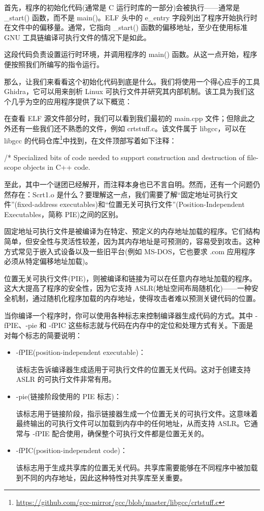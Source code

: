 首先，程序的初始化代码(通常是 C 运行时库的一部分)会被执行——通常是 \_start() 函数，而不是 main()。ELF 头中的 e\_entry 字段列出了程序开始执行时在文件中的偏移量。通常，它指向 \_start() 函数的偏移地址，至少在使用标准 GNU 工具链编译可执行文件的情况下是如此。

这段代码负责设置运行时环境，并调用程序的 main() 函数。从这一点开始，程序便按照我们所编写的指令运行。

那么，让我们来看看这个初始化代码到底是什么。我们将使用一个得心应手的工具 Ghidra，它可以用来剖析 Linux 可执行文件并研究其内部机制。该工具为我们这个几乎为空的应用程序提供了以下概览：


在查看 ELF 源文件部分时，我们可以看到我们最初的 main.cpp 文件；但除此之外还有一些我们还不熟悉的文件，例如 crtstuff.c。该文件属于 libgcc，可以在 libgcc 的代码仓库\footnote{\url{https://github.com/gcc-mirror/gcc/blob/master/libgcc/crtstuff.c}}中找到，在文件顶部写着如下注释：

\begin{cpp}
/* Specialized bits of code needed to support construction and destruction of file-scope objects in C++ code.
\end{cpp}

至此，其中一个谜团已经解开，而注释本身也已不言自明。然而，还有一个问题仍然存在：Scrt1.o 是什么？要理解这一点，我们需要了解“固定地址可执行文件”(fixed-address executables)和“位置无关可执行文件”(Position-Independent Executables，简称 PIE)之间的区别。

固定地址可执行文件是被编译为在特定、预定义的内存地址加载的程序。它们结构简单，但安全性与灵活性较差，因为其内存地址是可预测的，容易受到攻击。这种方式常见于嵌入式设备以及一些旧平台(例如 MS-DOS，它也要求 .com 应用程序必须从特定偏移地址加载)。

位置无关可执行文件(PIE)，则被编译和链接为可以在任意内存地址加载的程序。这大大提高了程序的安全性，因为它支持 ASLR(地址空间布局随机化)——一种安全机制，通过随机化程序加载的内存地址，使得攻击者难以预测关键代码的位置。

当你编译一个程序时，你可以使用各种标志来控制编译器生成代码的方式。其中 -fPIE、-pie 和 -fPIC 这些标志就与代码在内存中的定位和处理方式有关。下面是对每个标志的简要说明：

\begin{itemize}
\item 
-fPIE(position-independent executable)：

该标志告诉编译器生成适用于可执行文件的位置无关代码。这对于创建支持 ASLR 的可执行文件非常有用。

\item 
-pie(链接阶段使用的 PIE 标志)：

该标志用于链接阶段，指示链接器生成一个位置无关的可执行文件。这意味着最终输出的可执行文件可以加载到内存中的任何地址，从而支持 ASLR。它通常与 -fPIE 配合使用，确保整个可执行文件都是位置无关的。

\item 
-fPIC(position-independent code)：

该标志用于生成共享库的位置无关代码。共享库需要能够在不同程序中被加载到不同的内存地址，因此这种特性对共享库至关重要。
\end{itemize}

